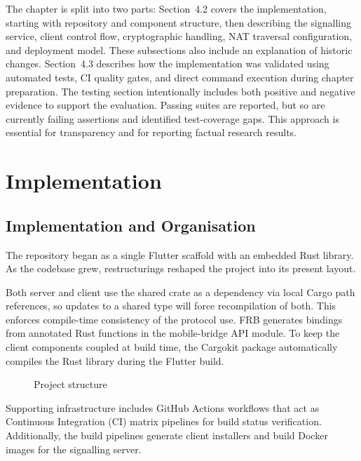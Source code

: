 \documentclass[12pt,a4paper,oneside]{report}
\begin{document}
The chapter is split into two parts: Section~4.2 covers the implementation, starting with repository and component structure, then describing the signalling service, client control flow, cryptographic handling, NAT traversal configuration, and deployment model. These subsections also include an explanation of historic changes. Section~4.3 describes how the implementation was validated using automated tests, CI quality gates, and direct command execution during chapter preparation. The testing section intentionally includes both positive and negative evidence to support the evaluation. Passing suites are reported, but so are currently failing assertions and identified test-coverage gaps. This approach is essential for transparency and for reporting factual research results.


\section{Implementation}
\label{sec:implementation}

\subsection{Implementation and Organisation}
\label{sec:impl-organisation}

The repository began as a single Flutter scaffold with an embedded Rust library. As the codebase grew, restructurings reshaped the project into its present layout.

Both server and client use the shared crate as a dependency via local Cargo path references, so updates to a shared type will force recompilation of both. This enforces compile-time consistency of the protocol use. FRB generates bindings from annotated Rust functions in the mobile-bridge API module. To keep the client components coupled at build time, the Cargokit package automatically compiles the Rust library during the Flutter build.

\begin{figure}[htbp]
  \centering
  \caption{Project structure}
  \label{fig:project-structure}
\end{figure}

Supporting infrastructure includes GitHub Actions workflows that act as Continuous Integration (CI) matrix pipelines for build status verification. Additionally, the build pipelines generate client installers and build Docker images for the signalling server.
\end{document}
